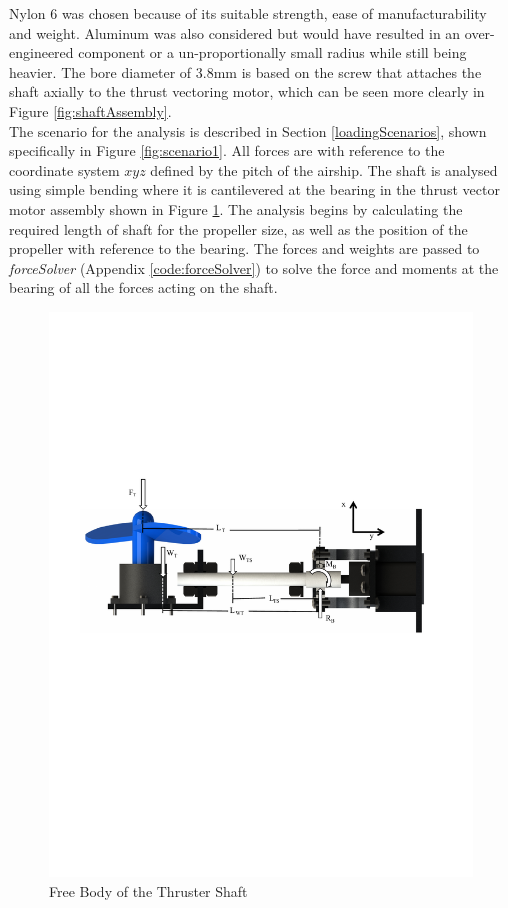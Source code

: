 \documentclass[../main.tex]{subfiles}
\begin{document}
Nylon 6 was chosen because of its suitable strength, ease of manufacturability and weight. Aluminum was also considered but would have resulted in an over-engineered component or a un-proportionally small radius while still being heavier. The bore diameter of 3.8mm is based on the screw that attaches the shaft axially to the thrust vectoring motor, which can be seen more clearly in Figure \ref{fig:shaftAssembly}.\\

The scenario for the analysis is described in Section \ref{loadingScenarios}, shown specifically in Figure \ref{fig:scenario1}. All forces are with reference to the coordinate system $xyz$ defined by the pitch of the airship. The shaft is analysed using simple bending where it is cantilevered at the bearing in the thrust vector motor assembly shown in Figure \ref{fig:thrusterShaftFBD}. The analysis begins by calculating the required length of shaft for the propeller size, as well as the position of the propeller with reference to the bearing. The forces and weights are passed to \textit{forceSolver} (Appendix \ref{code:forceSolver}) to solve the force and moments at the bearing of all the forces acting on the shaft.

\begin{figure}[H]
	\centering
	\includegraphics[width=.9\linewidth]{img/analysis/thruster/thrusterShaft.pdf}
	\caption{Free Body of the Thruster Shaft}
	\label{fig:thrusterShaftFBD}
\end{figure}
\end{document}
